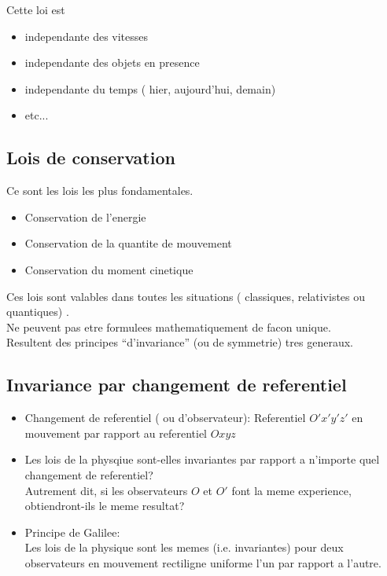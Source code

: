 \documentclass[../main.tex]{subfiles}
\begin{document}
Cette loi est 
\begin{itemize}
	\item independante des vitesses\\
	\item independante des objets en presence\\
	\item independante du temps ( hier, aujourd'hui, demain)\\
	\item etc...
\end{itemize}

\subsection{Lois de conservation}
Ce sont les lois les plus fondamentales.
\begin{itemize}
	\item Conservation de l'energie\\
	\item Conservation de la quantite de mouvement\\
	\item Conservation du moment cinetique
\end{itemize}
Ces lois sont valables dans toutes les situations ( classiques, relativistes ou quantiques) .\\
Ne peuvent pas etre formulees mathematiquement de facon unique.\\
Resultent des principes ``d'invariance''  (ou de symmetrie)  tres generaux.\\
\subsection{Invariance par changement de referentiel}
\begin{itemize}
	\item Changement de referentiel ( ou d'observateur):
	Referentiel $O'x'y'z'$ en mouvement par rapport au referentiel $Oxyz$ \\
\item Les lois de la physqiue sont-elles invariantes par rapport a n'importe quel changement de referentiel?\\
	Autrement dit, si les observateurs $O$ et $O'$ font la meme experience, obtiendront-ils le meme resultat?\\
\item Principe de Galilee:\\
	Les lois de la physique sont les memes (i.e. invariantes)  pour deux observateurs en mouvement rectiligne uniforme l'un par rapport a l'autre.
\end{itemize}
\end{document}
